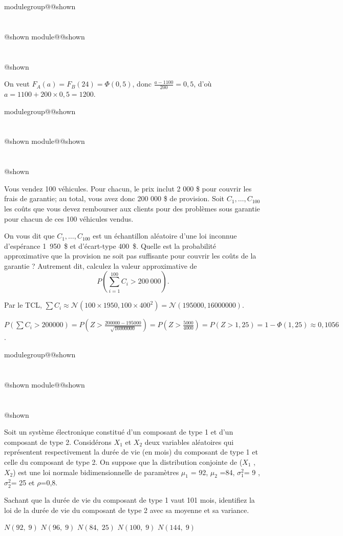 \documentclass{Evaluation}
\makeatletter
\newcommand{\currentmodulekey}{}
\newcommand{\currentmoduletitle}{}
\newcommand{\currentgroupkey}{}
\newcommand{\currentgrouptitle}{}
\newcommand{\showmoduleifneeded}{%
  \ifx\currentgroupkey\empty\else
    \expandafter\ifx\csname modulegroup@\currentgroupkey @shown\endcsname\relax
      \section*{\currentgrouptitle}%
      \expandafter\gdef\csname modulegroup@\currentgroupkey @shown\endcsname{1}%
    \fi
  \fi
  \expandafter\ifx\csname module@\currentmodulekey @shown\endcsname\relax
    \section*{\currentmoduletitle}%
    \expandafter\gdef\csname module@\currentmodulekey @shown\endcsname{1}%
  \fi
}
\newenvironment{A22}{\showmoduleifneeded}{}
\newenvironment{A23}{\showmoduleifneeded}{}
\newenvironment{A25}{\showmoduleifneeded}{}
\makeatother
\begin{document}
\begin{questions}
\begin{A23}
\begin{parts}
\begin{solution}
    On veut $F_A(a)=F_B(24)=\Phi(0,5)$, donc $\frac{a-1100}{200}=0,5$, d'où $a=1100+200\times 0,5=1200$.
\end{solution}
\end{parts}
\end{A23}

\begin{A25}
\question {} %
Vous vendez 100 véhicules. Pour chacun, le prix inclut 2 000 \$ pour couvrir les frais de garantie; au total, vous avez donc 200 000 \$ de provision.
Soit $C_1,\dots,C_{100}$ les coûts que vous devez rembourser aux clients pour des problèmes sous garantie pour chacun de ces 100 véhicules vendus.

On vous dit que
$C_1,\dots,C_{100}$ est un échantillon aléatoire d'une loi inconnue d'espérance 1~950~\$ et d'écart-type 400~\$. Quelle est la probabilité approximative
que la provision ne soit pas suffisante pour couvrir les coûts de la garantie ? Autrement dit, calculez la valeur approximative de
$$P\left(\sum_{i=1}^{100}C_i > 200~000\right).$$

\begin{solution}
    Par le TCL, $\sum C_i \approx \mathcal{N}(100\times 1950, 100\times 400^2)=\mathcal{N}(195000, 16000000)$.

    $P\left(\sum C_i>200000\right)=P\left(Z>\frac{200000-195000}{\sqrt{16000000}}\right)=P\left(Z>\frac{5000}{4000}\right)=P(Z>1,25)=1-\Phi(1,25)\approx 0,1056$.
\end{solution}
\end{A25}

\begin{A22}
\question {} %
Soit un système électronique constitué d'un composant de type 1 et d'un composant de type 2. Considérons ${X}_1 $ et ${X}_2 $ deux variables aléatoires qui représentent respectivement la durée de vie (en mois) du composant de type 1 et celle du composant de type 2. On suppose que la distribution conjointe de (${X}_1 $ , ${X}_2 $) est une loi normale bidimensionnelle de paramètres ${\mu}_1 $ = 92, ${\mu}_2 $ =84, ${\sigma}_1 ^2$= 9 , ${\sigma}_2 ^2$=  25 et $\rho $=0,8.

Sachant que la durée de vie du composant de type 1 vaut 101 mois, identifiez la loi de la durée de vie du composant de type 2 avec sa moyenne et sa variance.

\begin{checkboxes}
		\choice $N(92, \; 9)$  %
		\CorrectChoice $N(96,\;9)$ %
		\choice $N(84,\; 25)$ %
		\choice $N(100, \; 9)$ %
		\choice $N(144, \; 9)$ %
	\end{checkboxes}


\end{A22}
\end{questions}
\end{document}
